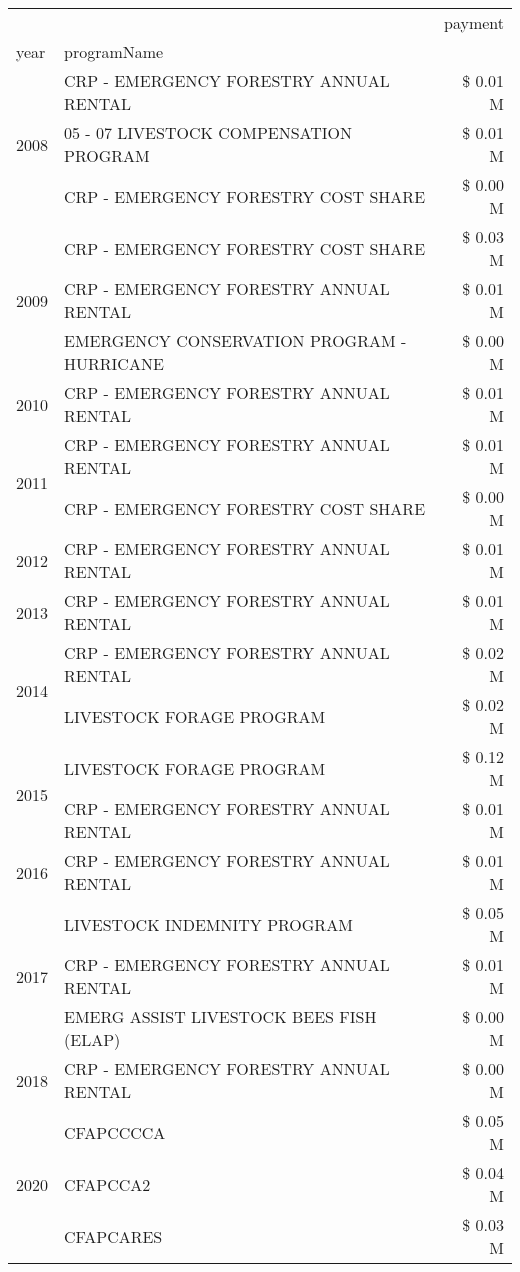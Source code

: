 \begin{tabular}{llr}
\toprule
 &  & payment \\
year & programName &  \\
\midrule
\multirow[t]{3}{*}{2008} & CRP - EMERGENCY FORESTRY ANNUAL RENTAL & \$ 0.01 M \\
 & 05 - 07 LIVESTOCK COMPENSATION PROGRAM & \$ 0.01 M \\
 & CRP - EMERGENCY FORESTRY COST SHARE & \$ 0.00 M \\
\cline{1-3}
\multirow[t]{3}{*}{2009} & CRP - EMERGENCY FORESTRY COST SHARE & \$ 0.03 M \\
 & CRP - EMERGENCY FORESTRY ANNUAL RENTAL & \$ 0.01 M \\
 & EMERGENCY CONSERVATION PROGRAM - HURRICANE & \$ 0.00 M \\
\cline{1-3}
2010 & CRP - EMERGENCY FORESTRY ANNUAL RENTAL & \$ 0.01 M \\
\cline{1-3}
\multirow[t]{2}{*}{2011} & CRP - EMERGENCY FORESTRY ANNUAL RENTAL & \$ 0.01 M \\
 & CRP - EMERGENCY FORESTRY COST SHARE & \$ 0.00 M \\
\cline{1-3}
2012 & CRP - EMERGENCY FORESTRY ANNUAL RENTAL & \$ 0.01 M \\
\cline{1-3}
2013 & CRP - EMERGENCY FORESTRY ANNUAL RENTAL & \$ 0.01 M \\
\cline{1-3}
\multirow[t]{2}{*}{2014} & CRP - EMERGENCY FORESTRY ANNUAL RENTAL & \$ 0.02 M \\
 & LIVESTOCK FORAGE PROGRAM & \$ 0.02 M \\
\cline{1-3}
\multirow[t]{2}{*}{2015} & LIVESTOCK FORAGE PROGRAM & \$ 0.12 M \\
 & CRP - EMERGENCY FORESTRY ANNUAL RENTAL & \$ 0.01 M \\
\cline{1-3}
2016 & CRP - EMERGENCY FORESTRY ANNUAL RENTAL & \$ 0.01 M \\
\cline{1-3}
\multirow[t]{3}{*}{2017} & LIVESTOCK INDEMNITY PROGRAM & \$ 0.05 M \\
 & CRP - EMERGENCY FORESTRY ANNUAL RENTAL & \$ 0.01 M \\
 & EMERG ASSIST LIVESTOCK BEES FISH (ELAP) & \$ 0.00 M \\
\cline{1-3}
2018 & CRP - EMERGENCY FORESTRY ANNUAL RENTAL & \$ 0.00 M \\
\cline{1-3}
\multirow[t]{3}{*}{2020} & CFAPCCCCA & \$ 0.05 M \\
 & CFAPCCA2 & \$ 0.04 M \\
 & CFAPCARES & \$ 0.03 M \\
\cline{1-3}
\bottomrule
\end{tabular}
